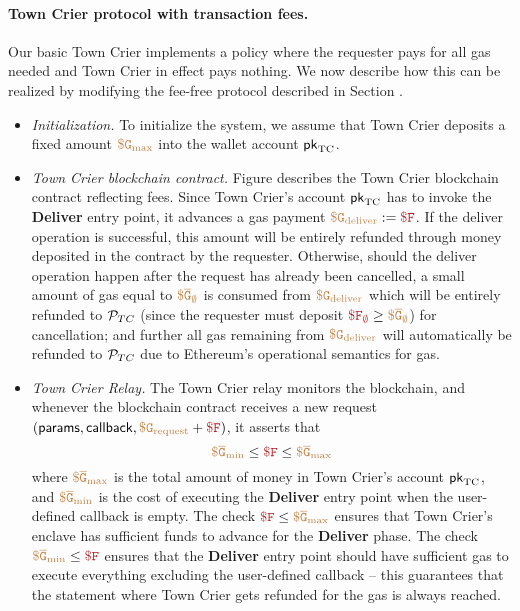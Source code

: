 \paragraph{Town Crier protocol with transaction fees.}
Our basic Town Crier implements a policy where the requester pays for all gas 
needed and Town Crier in effect pays nothing.
We now describe how this can be realized by modifying
the fee-free protocol described in Section . 

\begin{itemize}[leftmargin=5mm]
\item
{\it Initialization.}
To initialize the system, we assume that Town Crier 
deposits a fixed amount $\tt {\color{brown} \$ G_{\text{max}} }$ 
into the wallet account ${\sf pk}_{\textrm{TC}}$.
\item
{\it Town Crier blockchain contract.}
Figure  describes the  
Town Crier blockchain contract reflecting fees.
Since Town Crier's account 
${\sf pk}_{\textrm{TC}}$ has to invoke the {\bf Deliver} entry point, it 
advances a gas payment 
$\sbrown{\$ G_{\text{deliver}}} := \smaroon{\$ F}$.
If the deliver operation is successful, 
this amount will be entirely refunded through money deposited in the contract 
by the requester.
Otherwise, should the deliver operation happen after the request has already
been cancelled, 
a small amount of gas equal to $\tt {\color{brown} \$ \overline{G}_\emptyset }$ 
is consumed from $\tt {\color{brown} \$ G_{\text{deliver}} }$
which will be entirely refunded 
to ${\cal P}_{TC}$ (since the requester must deposit $\smaroon{\$ F_{\emptyset}} \geq \sbrown{\$ \overline{G}_{\emptyset}}$) for cancellation;
and further all gas remaining  
from $\tt {\color{brown} \$ G_{\text{deliver}} }$ will automatically 
be refunded to ${\cal P}_{TC}$ due to Ethereum's operational semantics for gas. 
\item
{\it Town Crier Relay.}
The Town Crier relay monitors
the blockchain, and whenever
the blockchain contract \tcont
receives a new request $({\sf params}, {\sf callback}, 
\sbrown{\$ G_{\text{request}}}+\smaroon{\$ F})$,
it asserts that 
\[
\sbrown{\$ \overline{G}_{\text{min}}}
\leq \smaroon{\$ F} \leq \sbrown{\$ \overline{G}_{\text{max}}}
\]
where $\tt {\color{brown} \$ \overline{G}_{\text{max}} }$ is the total amount of money
in Town Crier's account ${\sf pk}_{\textrm{TC}}$, 
and $\tt {\color{brown} \$ \overline{G}_{\text{min}} }$
is the cost of executing the {\bf Deliver} entry point 
when the user-defined callback is empty.
The check 
$\smaroon{\$ F} \leq \sbrown{\$ \overline{G}_{\text{max}}}$
ensures that Town Crier's enclave  
has sufficient funds to advance
for the {\bf Deliver} phase.
The check 
$\sbrown{\$ \overline{G}_{\text{min}}}
\leq \smaroon{\$ F}$
ensures that 
the {\bf Deliver} entry point should 
have sufficient gas to execute everything excluding the user-defined
callback -- this guarantees that the statement
where Town Crier gets refunded for the gas is always reached.



\end{itemize}

